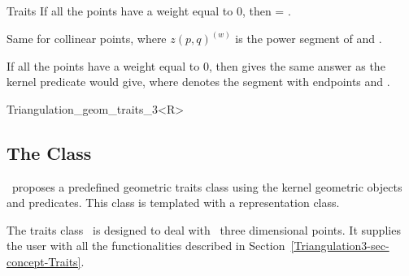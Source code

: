\begin{ccClass}{Traits}
If all the points have a weight equal to 0, then
 = .

{Same for collinear points, where ${z(p,q)}^{(w)}$ is the
power segment of  and .
}

If all the points have a weight equal to 0, then
 gives the same answer as the kernel predicate
 would give, where   denotes the
segment with endpoints  and .

	\end{ccClass} 

	\begin{ccClassTemplate}{Triangulation_geom_traits_3<R>}
	\subsection{The Class \protect {}}
	\label{Triangulation3-sec-class-Traits}

\cgal\ proposes a predefined geometric traits class using the kernel
geometric objects and predicates. 
This class is templated with a representation class.

The traits class \ccClassTemplateName\ is designed to deal with \cgal\ three
dimensional points. It supplies the user with all
the functionalities described in
Section~\ref{Triangulation3-sec-concept-Traits}.


\ccTypes
{}

\ccGlue
{}
\ccGlue
{}
\ccGlue
{}

	\end{ccClassTemplate} 


